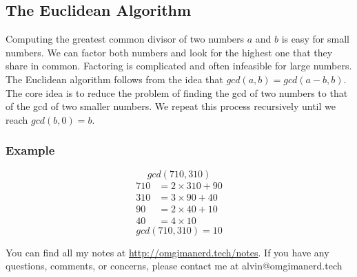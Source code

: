 \documentclass{math}
\begin{document}
\subsection*{The Euclidean Algorithm}
Computing the greatest common divisor of two numbers \( a \) and \( b \) is
easy for small numbers. We can factor both numbers and look for the highest one
that they share in common. Factoring is complicated and often infeasible for
large numbers. The Euclidean algorithm follows from the idea that \( gcd(a,b) =
gcd(a-b,b) \). The core idea is to reduce the problem of finding the gcd of
two numbers to that of the gcd of two smaller numbers. We repeat this process
recursively until we reach \( gcd(b,0) = b \).

\subsubsection*{Example}
\[ gcd(710,310) \]
\begin{align*}
  710 &= 2\times310+90 \\
  310 &= 3\times90+40 \\
  90 &= 2\times40+10 \\
  40 &= 4\times10
\end{align*}
\[ gcd(710,310) = 10 \]

\begin{center}
  You can find all my notes at \url{http://omgimanerd.tech/notes}. If you have
  any questions, comments, or concerns, please contact me at
  alvin@omgimanerd.tech
\end{center}
\end{document}
